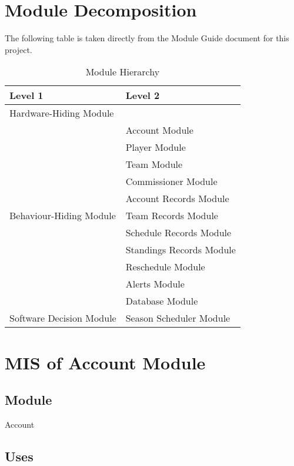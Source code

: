 \documentclass[12pt, titlepage]{article}
\begin{document}
\section{Module Decomposition}

The following table is taken directly from the Module Guide document for this project.

\begin{table}[h!]
\centering
\begin{tabular}{p{} p{}}
\toprule
\textbf{Level 1} & \textbf{Level 2}\\
\midrule

{Hardware-Hiding Module} & ~ \\
\midrule

\multirow{11}{0.3\textwidth}{Behaviour-Hiding Module} & Account Module\\
& Player Module\\
& Team Module\\
& Commissioner Module\\
& Account Records Module\\
& Team Records Module\\
& Schedule Records Module\\
& Standings Records Module\\
& Reschedule Module\\
& Alerts Module\\
& Database Module\\
\midrule

\multirow{1}{0.3\textwidth}{Software Decision Module} & Season Scheduler
Module\\
\bottomrule

\end{tabular}
\caption{Module Hierarchy}
\label{TblMH}
\end{table}

\newpage

\section{MIS of Account Module} \label{mAC}

\subsection{Module}

Account

\subsection{Uses}
\end{document}
